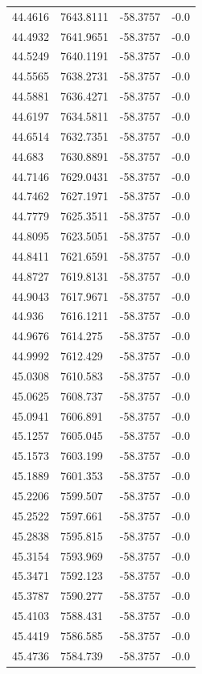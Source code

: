 \begin{table}[H]
\begin{tabular}{llll}
44.4616 & 7643.8111 & -58.3757 & -0.0 \\
44.4932 & 7641.9651 & -58.3757 & -0.0 \\
44.5249 & 7640.1191 & -58.3757 & -0.0 \\
44.5565 & 7638.2731 & -58.3757 & -0.0 \\
44.5881 & 7636.4271 & -58.3757 & -0.0 \\
44.6197 & 7634.5811 & -58.3757 & -0.0 \\
44.6514 & 7632.7351 & -58.3757 & -0.0 \\
44.683 & 7630.8891 & -58.3757 & -0.0 \\
44.7146 & 7629.0431 & -58.3757 & -0.0 \\
44.7462 & 7627.1971 & -58.3757 & -0.0 \\
44.7779 & 7625.3511 & -58.3757 & -0.0 \\
44.8095 & 7623.5051 & -58.3757 & -0.0 \\
44.8411 & 7621.6591 & -58.3757 & -0.0 \\
44.8727 & 7619.8131 & -58.3757 & -0.0 \\
44.9043 & 7617.9671 & -58.3757 & -0.0 \\
44.936 & 7616.1211 & -58.3757 & -0.0 \\
44.9676 & 7614.275 & -58.3757 & -0.0 \\
44.9992 & 7612.429 & -58.3757 & -0.0 \\
45.0308 & 7610.583 & -58.3757 & -0.0 \\
45.0625 & 7608.737 & -58.3757 & -0.0 \\
45.0941 & 7606.891 & -58.3757 & -0.0 \\
45.1257 & 7605.045 & -58.3757 & -0.0 \\
45.1573 & 7603.199 & -58.3757 & -0.0 \\
45.1889 & 7601.353 & -58.3757 & -0.0 \\
45.2206 & 7599.507 & -58.3757 & -0.0 \\
45.2522 & 7597.661 & -58.3757 & -0.0 \\
45.2838 & 7595.815 & -58.3757 & -0.0 \\
45.3154 & 7593.969 & -58.3757 & -0.0 \\
45.3471 & 7592.123 & -58.3757 & -0.0 \\
45.3787 & 7590.277 & -58.3757 & -0.0 \\
45.4103 & 7588.431 & -58.3757 & -0.0 \\
45.4419 & 7586.585 & -58.3757 & -0.0 \\
45.4736 & 7584.739 & -58.3757 & -0.0 \\

\end{tabular}
\end{table}
